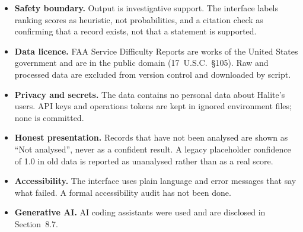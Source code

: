 \begin{itemize}
\item \textbf{Safety boundary.} Output is investigative support. The interface labels ranking scores as heuristic, not probabilities, and a citation check as confirming that a record exists, not that a statement is supported.
\item \textbf{Data licence.} FAA Service Difficulty Reports are works of the United States government and are in the public domain (17~U.S.C.~\S{}105). Raw and processed data are excluded from version control and downloaded by script.
\item \textbf{Privacy and secrets.} The data contains no personal data about Halite's users. API keys and operations tokens are kept in ignored environment files; none is committed.
\item \textbf{Honest presentation.} Records that have not been analysed are shown as ``Not analysed'', never as a confident result. A legacy placeholder confidence of 1.0 in old data is reported as unanalysed rather than as a real score.
\item \textbf{Accessibility.} The interface uses plain language and error messages that say what failed. A formal accessibility audit has not been done.
\item \textbf{Generative AI.} AI coding assistants were used and are disclosed in Section~8.7.
\end{itemize}
